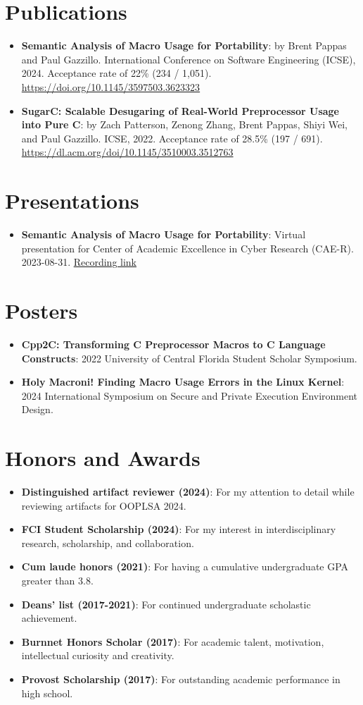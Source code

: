 \documentclass{article}
\newcommand{\resumeItem}[2]{
  \item\small{
    \textbf{#1}{: #2 \vspace{-2pt}}
  }
}
\newcommand{\resumeSubItem}[2]{\resumeItem{#1}{#2}\vspace{-3pt}}
\newcommand{\resumeSubHeadingListStart}{\begin{itemize}[leftmargin=*, label={}]}
\newcommand{\resumeSubHeadingListEnd}{\end{itemize}}
\begin{document}
\vspace{-5pt}
\section{Publications}
\resumeSubHeadingListStart{}

\resumeSubItem{Semantic Analysis of Macro Usage for Portability}
{by Brent Pappas and Paul Gazzillo. International Conference on Software Engineering (ICSE), 2024. Acceptance rate of 22\% (234 / 1,051).
	\url{https://doi.org/10.1145/3597503.3623323}}

\resumeSubItem{SugarC\@: Scalable Desugaring of Real-World Preprocessor Usage into Pure C}
{by Zach Patterson, Zenong Zhang, Brent Pappas, Shiyi Wei, and Paul Gazzillo. ICSE, 2022. Acceptance rate of 28.5\% (197 / 691).
	\url{https://dl.acm.org/doi/10.1145/3510003.3512763}}
\resumeSubHeadingListEnd{}

\vspace{-5pt}
\section{Presentations}
\resumeSubHeadingListStart{}
\resumeSubItem{Semantic Analysis of Macro Usage for Portability}
{Virtual presentation for Center of Academic Excellence in Cyber Research (CAE-R). 2023{-}08{-}31. \href{https://drive.google.com/file/d/1xCd34w54hs1iyaoXHz0MUkwlH-fP3HLo/view} {Recording link}}
\resumeSubHeadingListEnd{}

\vspace{-5pt}
\section{Posters}
\resumeSubHeadingListStart{}
\resumeSubItem{Cpp2C\@: Transforming C Preprocessor Macros to C Language Constructs}
{2022 University of Central Florida Student Scholar Symposium.}
\resumeSubItem{Holy Macroni! Finding Macro Usage Errors in the Linux Kernel}
{2024 International Symposium on Secure and Private Execution Environment Design.}
\resumeSubHeadingListEnd{}

\vspace{-5pt}
\section{Honors and Awards}
\resumeSubHeadingListStart{}
\resumeItem {Distinguished artifact reviewer (2024)}{For my attention to detail
	while reviewing artifacts for OOPLSA 2024.}
%
\resumeItem {FCI Student Scholarship (2024)}{For my interest in
	interdisciplinary research, scholarship, and collaboration.}
%
\resumeItem {Cum laude honors (2021)}{For having a cumulative undergraduate GPA
	greater than 3.8.}
%
\resumeItem {Deans' list (2017-2021)}{For continued undergraduate scholastic
	achievement.}
%
\resumeItem {Burnnet Honors Scholar (2017)}{For  academic talent, motivation,
	intellectual curiosity and creativity.}
%
\resumeItem{Provost Scholarship (2017)}{For outstanding academic performance in
	high school.}
\resumeSubHeadingListEnd{}
\end{document}
